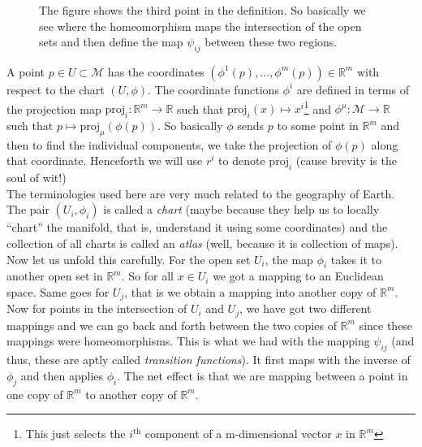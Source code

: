 \begin{figure}[H]
  \centering 
  
  \caption{The figure shows the third point in the definition. So basically we see where the homeomorphism maps the intersection of the open sets and then define the map $\psi_{ij}$ between these two regions.}
\end{figure}
A point $p \in U \subset \mathcal{M}$ has the coordinates $(\phi^1(p),\ldots, \phi^m(p) )\in \mathbb{R}^m$ with respect to the chart $(U,\phi)$. The coordinate functions $\phi^i$ are defined in terms of the projection map $\mathrm{proj}_i:\mathbb{R}^m \longrightarrow \mathbb{R}$ such that $\mathrm{proj}_i(x) \mapsto x^i$\footnote{This just selects the $i^{\text{th}}$ component of a m-dimensional vector $x$ in $\mathbb{R}^m$} and $\phi^\mu: \mathcal{M}\rightarrow \mathbb{R}$ such that $p \mapsto \mathrm{proj}_\mu(\phi(p))$. So basically $\phi$ sends $p$ to some point in $\mathbb{R}^m$ and then to find the individual components, we take the projection of $\phi(p)$ along that coordinate. Henceforth we will use $r^i$ to denote $\mathrm{proj}_i$ (cause brevity is the soul of wit!)\\[0.3cm]
The terminologies used here are very much related to the geography of Earth. The pair $(U_i, \phi_i)$ is called a \textit{chart} (maybe because they help us to locally ``chart'' the manifold, that is, understand it using some coordinates) and the collection of all charts is called an \textit{atlas} (well, because it is collection of maps). \\[0.3cm]
Now let us unfold this carefully. For the open set $U_i$, the map $\phi_i$ takes it to another open set in $\mathbb{R}^m$. So for all $x\in U_i$ we got a mapping to an Euclidean space. Same goes for $U_j$, that is we obtain a mapping into another copy of $\mathbb{R}^m$. Now for points in the intersection of $U_i$ and $U_j$, we have got two different mappings and we can go back and forth between the two copies of $\mathbb{R}^m$ since these mappings were homeomorphisms. This is what we had with the mapping $\psi_{ij}$ (and thus, these are aptly called \textit{transition functions}). It first maps with the inverse of $\phi_j$  and then applies $\phi_i$. The net effect is that we are mapping between a point in one copy of $\mathbb{R}^m$ to another copy of $\mathbb{R}^m$. \\[0.3cm]
